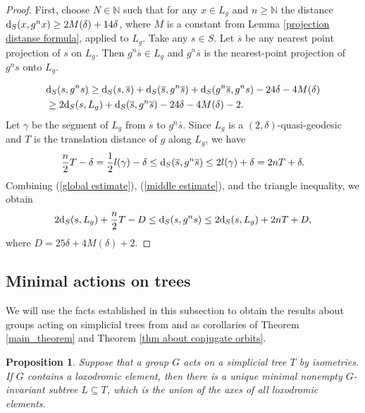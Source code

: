 \documentclass[11pt,letterpaper]{article}
\newcommand{\NN}{\mathbb{N}}
\renewcommand{\d}{{\rm d}}
\renewcommand{\d}{{\rm d}}
\newtheorem{prop}[thm]{Proposition}
\theoremstyle{definition}
\theoremstyle{remark}
\begin{document}
\begin{proof}
First, choose $N \in \NN$ such that for any $x \in L_g$ and $n \geq \NN$ the distance $\d_S(x, g^nx) \geq 2M(\delta)+14\delta$, where $M$ is a constant from Lemma \ref{projection distanse formula}, applied to $L_g$. Take any $s \in S$. Let $\overline s$ be any nearest point projection of $s$ on $L_g$. Then $g^n\overline{s} \in L_g$ and $g^n\overline{s}$ is the nearest-point projection of $g^ns$ onto $L_g$.
   
\begin{equation} \label{global estimate}
\begin{aligned}
&\d_S(s, g^ns) \geq \d_S(s, \overline{s})+\d_S(\overline{s}, g^n\overline{s})+\d_S(g^n\overline{s}, g^ns)-24 \delta-4M(\delta)\\
&\geq 2\d_S(s, L_g)+\d_S(\overline{s}, g^n\overline{s})-24 \delta-4M(\delta)-2.
\end{aligned}
\end{equation}
Let $\gamma$ be the segment of $L_g$ from $\overline{s}$ to $g^n\overline{s}$. Since $L_g$ is a $(2, \delta)$-quasi-geodesic and $T$ is the translation distance of $g$ along $L_g$, we have
\begin{equation} \label{middle estimate}
\frac{n}{2}T -\delta =\frac{1}{2}l(\gamma)-\delta \leq \d_S(\overline{s}, g^n\overline{s}) \leq 2l(\gamma)+\delta = 2nT + \delta.
\end{equation}
Combining (\ref{global estimate}), (\ref{middle estimate}), and the triangle inequality, we obtain 
$$
2\d_S(s, L_g)+\frac{n}{2}T - D \leq \d_S(s, g^ns) \leq 2\d_S(s, L_g)+2nT + D,
$$
where $D= 25\delta + 4M(\delta)+2$. 
\end{proof}

\subsection{Minimal actions  on trees}

We will use the facts established in this subsection to obtain the results about groups acting on simplicial trees from \cite{BM} and \cite{FMMS} as corollaries of Theorem \ref{main_theorem} and Theorem \ref{thm about conjugate orbits}.

\begin{prop}\cite[Proposition 7.5]{Bas}\label{union of loxodromic axes}
Suppose that a group $G$ acts on a simplicial tree $T$ by isometries.
If $G$ contains a loxodromic element, then there is a unique minimal nonempty $G$-invariant subtree $L \subseteq T$, which is the union of the axes of all loxodromic elements. 
\end{prop}
\end{document}
